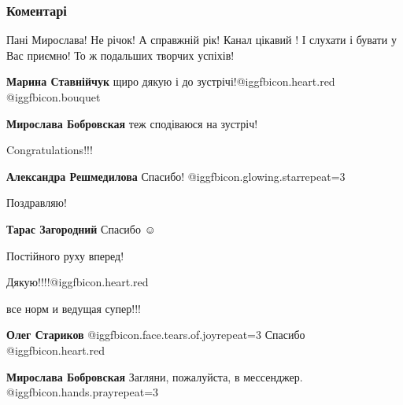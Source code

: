  
 
 
 
 
\subsubsection{Коментарі}
\label{sec:01_12_2021.fb.bobrovskaja_miroslava.kiev.1.kanal_godovschina.cmt}

\begin{itemize} %

Пані Мирослава!
Не річок! А справжній рік!
Канал цікавий ! І слухати і бувати у Вас приємно!
То ж подальших творчих успіхів!

\begin{itemize} %
\textbf{Марина Ставнійчук} щиро дякую і до зустрічі!@igg{fbicon.heart.red} @igg{fbicon.bouquet} 

\textbf{Мирослава Бобровская} теж сподіваюся на зустріч!

\end{itemize} %

Congratulations!!!

\textbf{Александра Решмедилова} Спасибо! @igg{fbicon.glowing.star}{repeat=3} 


Поздравляю!


\textbf{Тарас Загородний} Спасибо  ☺ ️ 

Постійного руху вперед!

Дякую!!!!@igg{fbicon.heart.red}

все норм и ведущая супер!!!

\begin{itemize} %
\textbf{Олег Стариков}  @igg{fbicon.face.tears.of.joy}{repeat=3} Спасибо @igg{fbicon.heart.red}

\textbf{Мирослава Бобровская} Загляни, пожалуйста, в мессенджер.  @igg{fbicon.hands.pray}{repeat=3} 
\end{itemize} %


\end{itemize}
